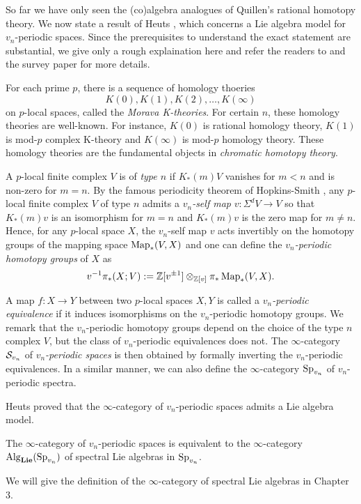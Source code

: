 So far we have only seen the (co)algebra analogues of Quillen's rational homotopy theory.
We now state a result of Heuts \cite{heuts2018lie}, which concerns a Lie algebra model for $v_n$-periodic spaces.
Since the prerequisites to understand the exact statement are substantial, we give only a rough explaination here and refer the readers to \cite{heuts2018lie} and the survey paper \cite{HeutsSurvey} for more details.

For each prime $p$, there is a sequence of homology thoeries $$K(0), K(1), K(2), \dots, K(\infty)$$ 
on $p$-local spaces, called the \emph{Morava K-theories}. 
For certain $n$, these homology theories are well-known. For instance, $K(0)$ is rational homology theory, $K(1)$ is mod-$p$ complex K-theory and $K(\infty)$ is mod-$p$ homology theory.
These homology theories are the fundamental objects in \emph{chromatic homotopy theory}.

A $p$-local finite complex $V$ is of \emph{type $n$} if $K_*(m)V$ vanishes for $m<n$ and is non-zero for $m=n$.
By the famous periodicity theorem of Hopkins-Smith \cite{Hopkins-Smith}, any $p$-local finite complex $V$ of type $n$ admits a \emph{$v_n$-self map} $v:\Sigma^d V\to V$ so that $K_*(m)v$ is an isomorphism for $m=n$ and $K_*(m)v$ is the zero map for $m\neq n$.
Hence, for any $p$-local space $X$, the $v_n$-self map $v$ acts invertibly on the homotopy groups of the mapping space $\operatorname{Map}_*(V,X)$ and one can define the \emph{$v_n$-periodic homotopy groups} of $X$ as
$$
v^{-1}\pi_*(X;V):= {\mathbb{Z}}[v^{\pm 1}]\otimes_{{\mathbb{Z}}[v] }\pi_* \operatorname{Map}_*(V,X).
$$

A map $f:X \to Y$ between two $p$-local spaces $X,Y$ is called a \emph{$v_n$-periodic equivalence} if it induces isomorphisms on the $v_n$-periodic homotopy groups.
We remark that the $v_n$-periodic homotopy groups depend on the choice of the type $n$ complex $V$, but the class of $v_n$-periodic equivalences does not.
The $\infty$-category ${\mathcal{S}}_{v_n}$ of \emph{$v_n$-periodic spaces} is then obtained by formally inverting the $v_n$-periodic equivalences.
In a similar manner, we can also define the $\infty$-category $\operatorname{Sp}_{v_n}$ of $v_n$-periodic spectra.

Heuts proved that the $\infty$-category of $v_n$-periodic spaces admits a Lie algebra model.
\begin{theorem}
\cite{heuts2018lie}
The $\infty$-category of $v_n$-periodic spaces is equivalent to the $\infty$-category $\operatorname{Alg}_{\mathbf{Lie}}(\operatorname{Sp}_{v_n})$ of spectral Lie algebras in $\operatorname{Sp}_{v_n}$.
\end{theorem}
We will give the definition of the $\infty$-category of spectral Lie algebras in Chapter 3.

